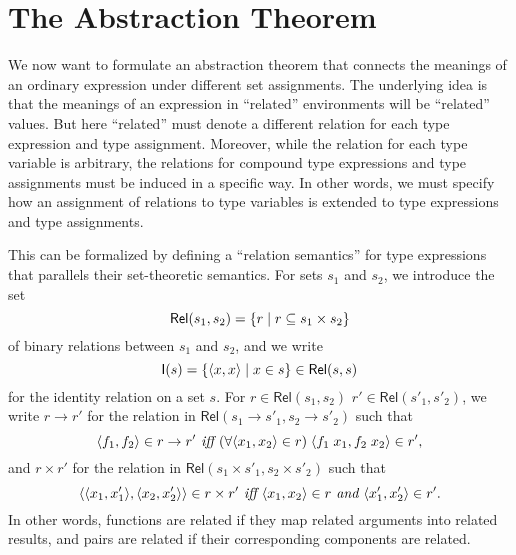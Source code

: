 \documentclass[sigplan,screen,nonacm,balance=false]{acmart}
\theoremstyle{plain}
\DeclarePairedDelimiter{\set}{\{}{\}}
\DeclarePairedDelimiter{\pair}{\langle}{\rangle}
\newcommand{\Rel}{\mathsf{Rel}}
\newcommand{\Id}{\mathsf{I}}
\begin{document}
\section{The Abstraction Theorem}

We now want to formulate an abstraction theorem that connects the meanings of an ordinary expression under different set assignments.
The underlying idea is that the meanings of an expression in ``related'' environments will be ``related'' values.
But here ``related'' must denote a different relation for each type expression and type assignment.
Moreover, while the relation for each type variable is arbitrary, the relations for compound type expressions and type assignments must be induced in a specific way.
In other words, we must specify how an assignment of relations to type variables is extended to type expressions and type assignments.

This can be formalized by defining a ``relation semantics'' for type expressions that parallels their set-theoretic semantics.
For sets $s_1$ and $s_2$, we introduce the set
%
\begin{equation*}
  \Rel(s_1, s_2) = \set{r \mid r \subseteq s_1 \times s_2}
\end{equation*}
%
of binary relations between $s_1$ and $s_2$, and we write
%
\begin{equation*}
  \Id(s) = \set{\pair{x, x} \mid x \in s} \in \Rel(s, s)
\end{equation*}
%
for the identity relation on a set $s$.
For $r \in \Rel(s_1, s_2)$ $r' \in \Rel(s'_1, s'_2)$, we write $r \to r'$ for the relation in $\Rel(s_1 \to s'_1, s_2 \to s'_2)$ such that
%
\begin{equation*}
  \pair{f_1, f_2} \in r \to r' \textit{ iff } (\forall \pair{x_1, x_2} \in r) \; \pair{f_1 \; x_1, f_2 \; x_2} \in r',
\end{equation*}
%
and $r \times r'$ for the relation in $\Rel(s_1 \times s'_1, s_2 \times s'_2)$ such that
%
\begin{equation*}
  \pair{\pair{x_1, x'_1}, \pair{x_2, x'_2}} \in r \times r' \textit{ iff } \pair{x_1, x_2} \in r \textit{ and } \pair{x'_1, x'_2} \in r'.
\end{equation*}
%
In other words, functions are related if they map related arguments into related results, and pairs are related if their corresponding components are related.
\end{document}
